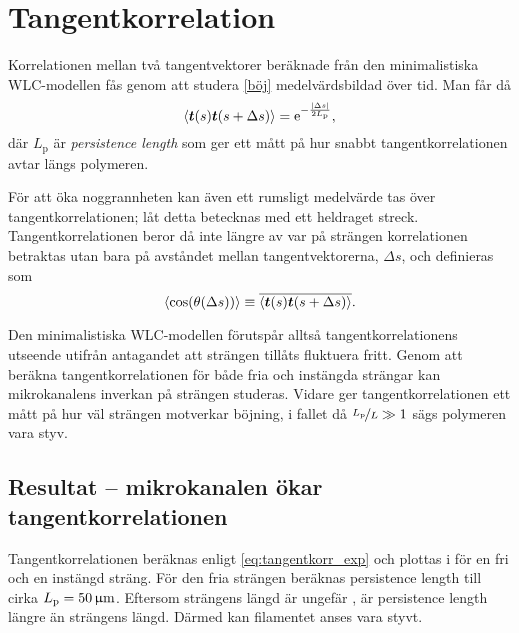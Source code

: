 \section{Tangentkorrelation}

Korrelationen mellan två tangentvektorer beräknade från den minimalistiska WLC-modellen fås genom att studera \eqref{böj} medelvärdsbildad över tid. Man får då \cite{Landau1958}
\begin{equation} \label{eq:tangentkorr_exp}
\ev{\mathbf{t}(s)\mathbf{t}(s+\Delta s)}=\ee^{-\frac{\abs{\Delta s}}{2L_\text{p}}},
\end{equation}
där $L_\text{p}$ är \emph{persistence length} som ger ett mått på hur snabbt tangentkorrelationen avtar längs polymeren. 

För att öka noggrannheten kan även ett rumsligt medelvärde tas över tangentkorrelationen; låt detta betecknas med ett heldraget streck. Tangentkorrelationen beror då inte längre av var på strängen korrelationen betraktas utan bara på avståndet mellan tangentvektorerna, $\Delta s$, och definieras som
\begin{equation}
\label{tangkorr}
    \ev{\cos(\theta(\Delta s))}\equiv\overline{\ev{\mathbf{t}(s)\mathbf{t}(s+\Delta s)}}.
\end{equation}

Den minimalistiska WLC-modellen förutspår alltså tangentkorrelationens utseende utifrån antagandet att strängen tillåts fluktuera fritt. Genom att beräkna tangentkorrelationen för både fria och instängda strängar kan mikrokanalens inverkan på strängen studeras. Vidare ger tangentkorrelationen ett mått på hur väl strängen motverkar böjning, i fallet då $\nicefrac{L_\text{p}}{L}\gg1$ sägs polymeren vara styv. 



\subsection{Resultat -- mikrokanalen ökar tangentkorrelationen}

Tangentkorrelationen beräknas enligt \eqref{eq:tangentkorr_exp} och plottas i  för en fri och en instängd sträng. För den fria strängen beräknas persistence length till cirka $L_\text{p}=\unit[50]{\micro{m}}$. Eftersom strängens längd är ungefär \unit[35]{}, är persistence length längre än strängens längd. Därmed kan filamentet anses vara styvt.


